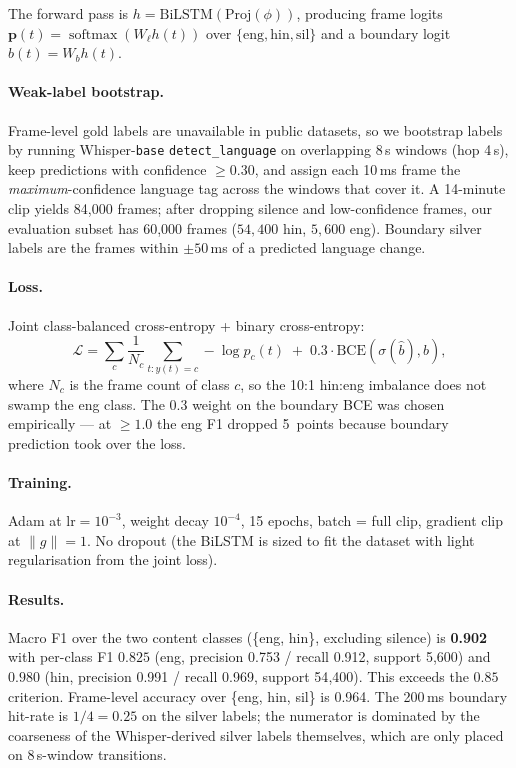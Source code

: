 \documentclass[conference]{IEEEtran}
\begin{document}
\noindent The forward pass is
$h = \text{BiLSTM}(\text{Proj}(\phi))$, producing frame logits
$\mathbf{p}(t) = \operatorname{softmax}(W_\ell h(t))$ over
$\{\mathrm{eng,hin,sil}\}$ and a boundary logit
$\hat{b}(t) = W_b h(t)$.

\paragraph*{Weak-label bootstrap.} Frame-level gold labels are unavailable
in public datasets, so we bootstrap labels by running
Whisper-\texttt{base} \texttt{detect\_language} on overlapping 8\,s windows
(hop 4\,s), keep predictions with confidence $\ge 0.30$, and assign each
10\,ms frame the \emph{maximum}-confidence language tag across the windows
that cover it. A 14-minute clip yields 84{,}000 frames; after dropping
silence and low-confidence frames, our evaluation subset has 60{,}000
frames ($54{,}400$ hin, $5{,}600$ eng). Boundary silver labels are the
frames within $\pm 50$\,ms of a predicted language change.

\paragraph*{Loss.} Joint class-balanced cross-entropy + binary
cross-entropy:
\[
\mathcal{L} = \sum_{c}\frac{1}{N_{c}}\sum_{t: y(t)=c}\!\!
    -\log p_{c}(t) \;+\; 0.3\cdot\mathrm{BCE}(\sigma(\hat{b}), b),
\]
where $N_{c}$ is the frame count of class $c$, so the 10:1 hin:eng
imbalance does not swamp the eng class. The $0.3$ weight on the boundary
BCE was chosen empirically --- at $\ge 1.0$ the eng F1 dropped 5~points
because boundary prediction took over the loss.

\paragraph*{Training.} Adam at $\mathrm{lr}=10^{-3}$, weight decay $10^{-4}$,
15 epochs, batch = full clip, gradient clip at $\lVert g\rVert=1$. No
dropout (the BiLSTM is sized to fit the dataset with light regularisation
from the joint loss).

\paragraph*{Results.} Macro F1 over the two content classes
(\{eng, hin\}, excluding silence) is \textbf{0.902} with per-class F1
$\mathbf{0.825}$ (eng, precision 0.753 / recall 0.912, support 5{,}600)
and $\mathbf{0.980}$ (hin, precision 0.991 / recall 0.969, support
54{,}400). This exceeds the $0.85$ criterion. Frame-level accuracy over
\{eng, hin, sil\} is 0.964. The 200\,ms boundary hit-rate is
$1/4 = 0.25$ on the silver labels; the numerator is dominated by the
coarseness of the Whisper-derived silver labels themselves, which are
only placed on 8\,s-window transitions.
\end{document}
